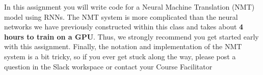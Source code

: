 In this assignment you will write code for a Neural Machine Translation (NMT) model using RNNs. The NMT system is more complicated than the neural networks we have previously constructed within this class and takes about \textbf{4 hours to train on a GPU}. Thus, we strongly recommend you get started early with this assignment. Finally, the notation and implementation of the NMT system is a bit tricky, so if you ever get stuck along the way, please post a question in the Slack workspace or contact your Course Facilitator